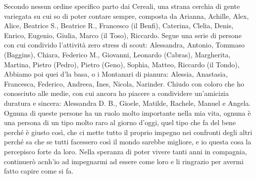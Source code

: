 Secondo nessun ordine specifico parto dai Cereali, una strana cerchia di gente variegata su cui so di poter contare sempre, composta da Arianna, Achille, Alex, Alice, Beatrice S., Beatrice R., Francesco (il Benfi), Caterina, Clelia, Denis, Enrico, Eugenio, Giulia, Marco (il Toso), Riccardo.
Segue una serie di persone con cui condivido l'attività zero stress di scout: Alessandra, Antonio, Tommaso (Baggins), Chiara, Federico M., Giovanni, Leonardo (Cabras), Margherita, Martina, Pietro (Pedro), Pietro (Geno), Sophia, Matteo, Riccardo (il Tondo),
Abbiamo poi quei d'la basa, o i Montanari di pianura: Alessia, Anastasia, Francesca, Federico, Andreea, Ines, Nicola, Narinder.
Chiudo con coloro che ho conosciuto alle medie, con cui ancora ho piacere a condividere un'amicizia duratura e sincera: Alessandra D. B., Gioele, Matilde, Rachele, Manuel e Angela.
Ognuna di queste persone ha un ruolo molto importante nella mia vita, ognuna è una persona di un tipo molto raro al giorno d'oggi, quel tipo che fa del bene perché è giusto così, che ci mette tutto il proprio impegno nei confronti degli altri perché sa che se tutti facessero così il mondo sarebbe migliore, e io questa cosa la percepisco forte da loro. Nella speranza di poter vivere tanti anni in compagnia, continuerò acnh'io ad impegnarmi ad essere come loro e li ringrazio per avermi fatto capire come si fa.
